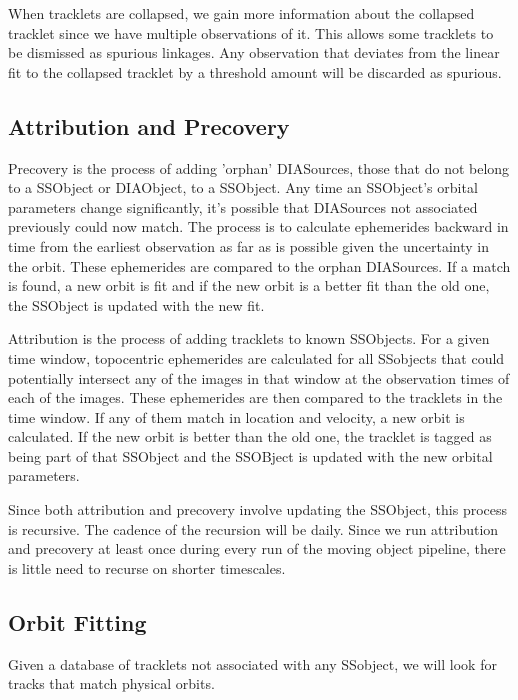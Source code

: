 When tracklets are collapsed, we gain more information about the collapsed tracklet since we have multiple observations of it.  This allows some tracklets to be dismissed as spurious linkages.  Any observation that deviates from the linear fit to the collapsed tracklet by a threshold amount will be discarded as spurious.

\subsection{Attribution and Precovery}
\label{sec:acAttributionAndPrecovery}
Precovery is the process of adding 'orphan' DIASources, those that do not belong to a SSObject or DIAObject, to a SSObject.  Any time an SSObject's orbital parameters change significantly, it's possible that DIASources not associated previously could now match.  The process is to calculate ephemerides backward in time from the earliest observation as far as is possible given the uncertainty in the orbit.  These ephemerides are compared to the orphan DIASources.  If a match is found, a new orbit is fit and if the new orbit is a better fit than the old one, the SSObject is updated with the new fit.

Attribution is the process of adding tracklets to known SSObjects.  For a given time window, topocentric ephemerides are calculated for all SSobjects that could potentially intersect any of the images in that window at the observation times of each of the images.  These ephemerides are then compared to the tracklets in the time window.  If any of them match in location and velocity, a new orbit is calculated.  If the new orbit is better than the old one, the tracklet is tagged as being part of that SSObject and the SSOBject is updated with the new orbital parameters.

Since both attribution and precovery involve updating the SSObject, this process is recursive.  The cadence of the recursion will be daily.  Since we run attribution and precovery at least once during every run of the moving object pipeline, there is little need to recurse on shorter timescales.


\subsection{Orbit Fitting}
\label{sec:acOrbitFitting}
Given a database of tracklets not associated with any SSobject, we will look for tracks that match physical orbits.

